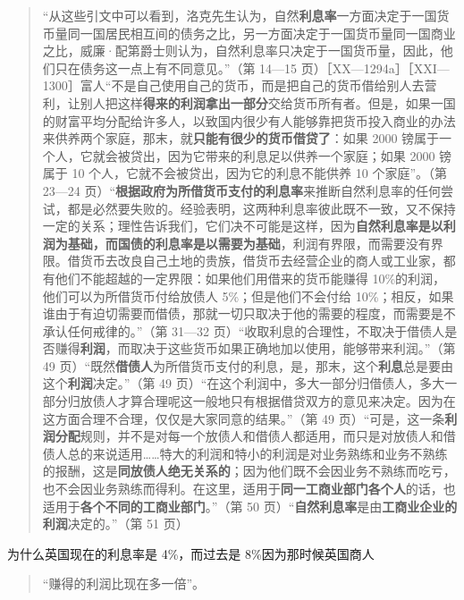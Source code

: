 \begin{quote}“从这些引文中可以看到，洛克先生认为，自然\textbf{利息率}一方面决定于一国货币量同一国居民相互间的债务之比，另一方面决定于一国货币量同一国商业之比，威廉·配第爵士则认为，自然利息率只决定于一国货币量，因此，他们只在债务这一点上有不同意见。”（第 14—15 页）［XX—1294a］［XXI—1300］富人“不是自己使用自己的货币，而是把自己的货币借给别人去营利，让别人把这样\textbf{得来的利润拿出一部分}交给货币所有者。但是，如果一国的财富平均分配给许多人，以致国内很少有人能够靠把货币投入商业的办法来供养两个家庭，那末，就\textbf{只能有很少的货币借贷了}：如果 2000 镑属于一个人，它就会被贷出，因为它带来的利息足以供养一个家庭；如果 2000 镑属于 10 个人，它就不会被贷出，因为它的利息不能供养 10 个家庭”。（第 23—24 页）“\textbf{根据政府为所借货币支付的利息率}来推断自然利息率的任何尝试，都是必然要失败的。经验表明，这两种利息率彼此既不一致，又不保持一定的关系；理性告诉我们，它们决不可能是这样，因为\textbf{自然利息率是以利润为基础，而国债的利息率是以需要为基础}，利润有界限，而需要没有界限。借货币去改良自己土地的贵族，借货币去经营企业的商人或工业家，都有他们不能超越的一定界限：如果他们用借来的货币能赚得 10\%的利润，他们可以为所借货币付给放债人 5\%；但是他们不会付给 10\%；相反，如果谁由于有迫切需要而借债，那就一切只取决于他的需要的程度，而需要是不承认任何戒律的。”（第 31—32 页）“收取利息的合理性，不取决于借债人是否赚得\textbf{利润}，而取决于这些货币如果正确地加以使用，能够带来利润。”（第 49 页）“既然\textbf{借债人}为所借货币支付的利息，是，那末，这个\textbf{利息}总是要由这个\textbf{利润}决定。”（第 49 页）“在这个利润中，多大一部分归借债人，多大一部分归放债人才算合理呢这一般地只有根据借贷双方的意见来决定。因为在这方面合理不合理，仅仅是大家同意的结果。”（第 49 页）“可是，这一条\textbf{利润分配}规则，并不是对每一个放债人和借债人都适用，而只是对放债人和借债人总的来说适用……特大的利润和特小的利润是对业务熟练和业务不熟练的报酬，这是\textbf{同放债人绝无关系的}；因为他们既不会因业务不熟练而吃亏，也不会因业务熟练而得利。在这里，适用于\textbf{同一工商业部门各个人}的话，也适用于\textbf{各个不同的工商业部门}。”（第 50 页）“\textbf{自然利息率}是由\textbf{工商业企业的利润}决定的。”（第 51 页）\end{quote}

为什么英国现在的利息率是 4\%，而过去是 8\%因为那时候英国商人

\begin{quote}“赚得的利润比现在多一倍”。\end{quote}

